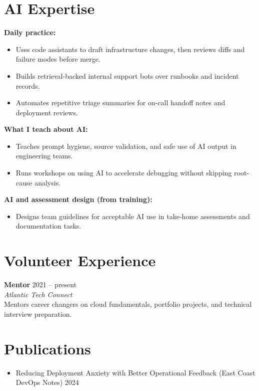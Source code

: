 \documentclass[10pt]{article}
\begin{document}
\section*{AI Expertise}

\textbf{Daily practice:}
\begin{itemize}
    \item Uses code assistants to draft infrastructure changes, then reviews diffs and failure modes before merge.
    \item Builds retrieval-backed internal support bots over runbooks and incident records.
    \item Automates repetitive triage summaries for on-call handoff notes and deployment reviews.
\end{itemize}

\textbf{What I teach about AI:}
\begin{itemize}
    \item Teaches prompt hygiene, source validation, and safe use of AI output in engineering teams.
    \item Runs workshops on using AI to accelerate debugging without skipping root-cause analysis.
\end{itemize}

\textbf{AI and assessment design (from training):}
\begin{itemize}
    \item Designs team guidelines for acceptable AI use in take-home assessments and documentation tasks.
\end{itemize}

\section*{Volunteer Experience}
\textbf{Mentor} \hfill 2021 -- present \\
\textit{Atlantic Tech Connect} \\
Mentors career changers on cloud fundamentals, portfolio projects, and technical interview preparation. \\

\section*{Publications}
\begin{itemize}[nosep,leftmargin=*]
    \item Reducing Deployment Anxiety with Better Operational Feedback (East Coast DevOps Notes) \hfill 2024
\end{itemize}
\end{document}
